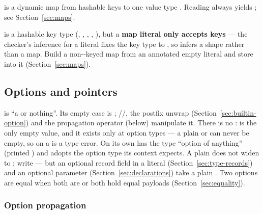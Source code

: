  is a dynamic map from hashable keys  to one
value type . Reading  always yields ; see
Section~\ref{sec:maps}.

 is a hashable key type (, , ,
, ), but a \textbf{map literal only accepts 
keys} --- the checker's inference for a literal fixes the key type to
, so  infers a shape rather than a map. Build a
non--keyed map from an annotated empty literal and store into
it (Section~\ref{sec:maps}).

\subsection{Options and pointers}
\label{sec:type-options}

 is ``a  or nothing''. Its empty case is ;
//, the postfix unwrap 
(Section~\ref{sec:builtin-option}) and the propagation operator 
(below) manipulate it. There is no
:  is the only empty value, and it exists only at
option types --- a plain  or  can never be empty, so
 on a  is a type error. On its own  has
the type ``option of anything'' (printed ) and adopts the
option type its context expects. A plain  does not widen to
; write  --- but an optional record field in a literal
(Section~\ref{sec:type-records}) and an optional parameter
(Section~\ref{sec:declarations}) take a plain . Two options are equal when both are
 or both hold equal payloads (Section~\ref{sec:equality}).

\subsubsection{Option propagation}
\label{sec:opt-propagation}

